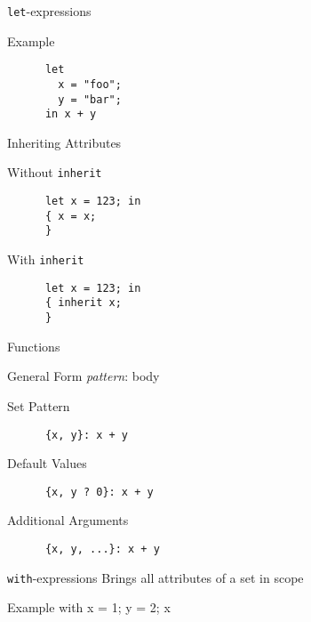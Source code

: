 \documentclass{beamer}
\begin{document}
\begin{frame}[fragile]{\texttt{let}-expressions}
  \begin{block}{Example}
    \begin{lstlisting}
      let
        x = "foo";
        y = "bar";
      in x + y
    \end{lstlisting}
  \end{block}
\end{frame}

\begin{frame}[fragile]{Inheriting Attributes}
  \begin{block}{Without \texttt{inherit}}
    \begin{lstlisting}
      let x = 123; in
      { x = x;
      }
    \end{lstlisting}
  \end{block}
  \begin{block}{With \texttt{inherit}}
    \begin{lstlisting}
      let x = 123; in
      { inherit x;
      }
    \end{lstlisting}
  \end{block}
\end{frame}

\begin{frame}[fragile]{Functions}
  \begin{block}{General Form}
    \emph{pattern}: body
  \end{block}
  \begin{block}{Set Pattern}
    \begin{lstlisting}
      {x, y}: x + y
    \end{lstlisting}
  \end{block}
  \begin{block}{Default Values}
    \begin{lstlisting}
      {x, y ? 0}: x + y
    \end{lstlisting}
  \end{block}
  \begin{block}{Additional Arguments}
    \begin{lstlisting}
      {x, y, ...}: x + y
    \end{lstlisting}
  \end{block}
\end{frame}

\begin{frame}[fragile]{\texttt{with}-expressions}
  Brings all attributes of a set in scope

  \begin{block}{Example}
    with {x = 1; y = 2}; x
  \end{block}
\end{frame}
\end{document}
